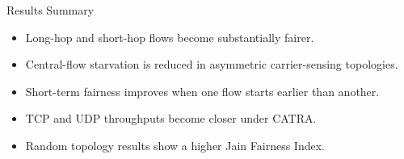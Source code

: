 \begin{frame}{Results Summary}


\vspace{0.35cm}

\begin{itemize}
    \item Long-hop and short-hop flows become substantially fairer.
    \item Central-flow starvation is reduced in asymmetric carrier-sensing topologies.
    \item Short-term fairness improves when one flow starts earlier than another.
    \item TCP and UDP throughputs become closer under CATRA.
    \item Random topology results show a higher Jain Fairness Index.
\end{itemize}
\end{frame}
